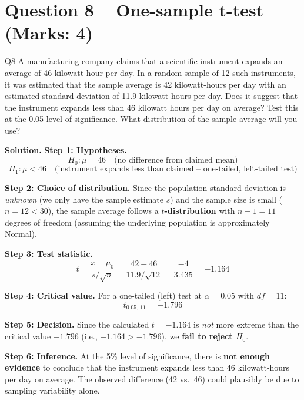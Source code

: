 \documentclass[11pt]{article}
\newcommand{\soln}{\par\noindent\textcolor{acolor}{\textbf{Solution.}}\quad}
\begin{document}
\section{Question 8 -- One-sample t-test (Marks: 4)}
\begin{question}{Q8}
A manufacturing company claims that a scientific instrument expands an average of 46 kilowatt-hour per day. In a random sample of 12 such instruments, it was estimated that the sample average is 42 kilowatt-hours per day with an estimated standard deviation of 11.9 kilowatt-hours per day. Does it suggest that the instrument expands less than 46 kilowatt hours per day on average? Test this at the 0.05 level of significance. What distribution of the sample average will you use?
\end{question}

\soln
\textbf{Step 1: Hypotheses.}
\[
H_0: \mu = 46 \quad \text{(no difference from claimed mean)}
\]
\[
H_1: \mu < 46 \quad \text{(instrument expands less than claimed -- one-tailed, left-tailed test)}
\]

\textbf{Step 2: Choice of distribution.} Since the population standard deviation is \emph{unknown} (we only have the sample estimate $s$) and the sample size is small ($n=12 < 30$), the sample average follows a \textbf{$t$-distribution} with $n-1 = 11$ degrees of freedom (assuming the underlying population is approximately Normal).

\textbf{Step 3: Test statistic.}
\[
t = \frac{\bar{x} - \mu_0}{s/\sqrt{n}} = \frac{42-46}{11.9/\sqrt{12}} = \frac{-4}{3.435} = -1.164
\]

\textbf{Step 4: Critical value.} For a one-tailed (left) test at $\alpha=0.05$ with $df=11$:
\[
t_{0.05,\,11} = -1.796
\]

\textbf{Step 5: Decision.} Since the calculated $t = -1.164$ is \emph{not} more extreme than the critical value $-1.796$ (i.e., $-1.164 > -1.796$), we \textbf{fail to reject $H_0$}.

\textbf{Step 6: Inference.} At the 5\% level of significance, there is \textbf{not enough evidence} to conclude that the instrument expands less than 46 kilowatt-hours per day on average. The observed difference (42 vs.\ 46) could plausibly be due to sampling variability alone.
\end{document}
